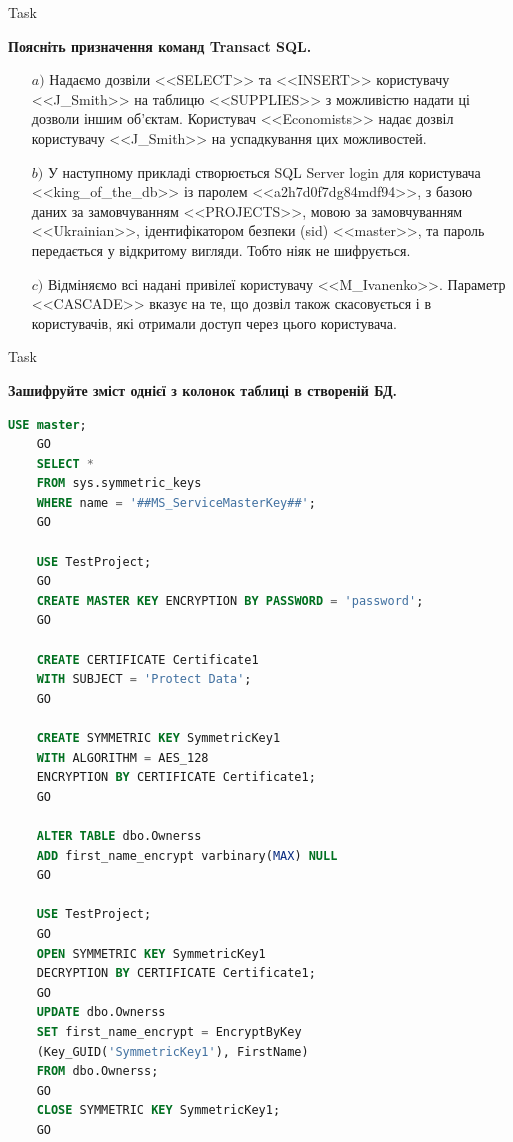 \documentclass[a4paper,12pt]{article}
\newcommand{\RomanNumeralCaps}[1]{\MakeUppercase{\romannumeral #1}}
\begin{document}
\newpage
    \begin{center}
        \Large{Task \RomanNumeralCaps{2}}
    \end{center}
	\begin{center}
		\textbf{Поясніть призначення команд Transact SQL.}
	\end{center}
	\begin{enumerate}
		\item[$a)$] Надаємо дозвіли <<SELECT>> та <<INSERT>> користувачу <<J\_Smith>> на таблицю <<SUPPLIES>> 
		з можливістю надати ці дозволи іншим об'єктам. Користувач <<Economists>> надає дозвіл 
		користувачу <<J\_Smith>> на успадкування цих можливостей.
		\item[$b)$] У наступному прикладі створюється SQL Server login для 
		користувача <<king\_of\_the\_db>> із паролем <<a2h7d0f7dg84mdf94>>, з базою даних за 
		замовчуванням <<PROJECTS>>, мовою за замовчуванням <<Ukrainian>>, ідентифікатором безпеки (sid)
		<<master>>, та пароль передається у відкритому вигляди. Тобто ніяк не шифрується.
		\item[$c)$] Відміняємо всі надані привілеї користувачу <<M\_Ivanenko>>.
		Параметр <<CASCADE>> вказує на те, що дозвіл також скасовується і в користувачів, які отримали доступ через цього користувача.
	\end{enumerate}

	\begin{center}
        \Large{Task \RomanNumeralCaps{3}}
    \end{center}
	\begin{center}
		\textbf{Зашифруйте зміст однієї з колонок таблиці в створеній БД.}
	\end{center}
	\begin{lstlisting}[language=SQL]
	USE master;
	GO
	SELECT *
	FROM sys.symmetric_keys
	WHERE name = '##MS_ServiceMasterKey##';
	GO
	
	USE TestProject;
	GO
	CREATE MASTER KEY ENCRYPTION BY PASSWORD = 'password';
	GO
	
	CREATE CERTIFICATE Certificate1
	WITH SUBJECT = 'Protect Data';
	GO
	
	CREATE SYMMETRIC KEY SymmetricKey1 
	WITH ALGORITHM = AES_128 
	ENCRYPTION BY CERTIFICATE Certificate1;
	GO
	
	ALTER TABLE dbo.Ownerss 
	ADD first_name_encrypt varbinary(MAX) NULL
	GO
	
	USE TestProject;
	GO
	OPEN SYMMETRIC KEY SymmetricKey1
	DECRYPTION BY CERTIFICATE Certificate1;
	GO
	UPDATE dbo.Ownerss
	SET first_name_encrypt = EncryptByKey 
	(Key_GUID('SymmetricKey1'), FirstName)
	FROM dbo.Ownerss;
	GO
	CLOSE SYMMETRIC KEY SymmetricKey1;
	GO
	\end{lstlisting}
\end{document}
